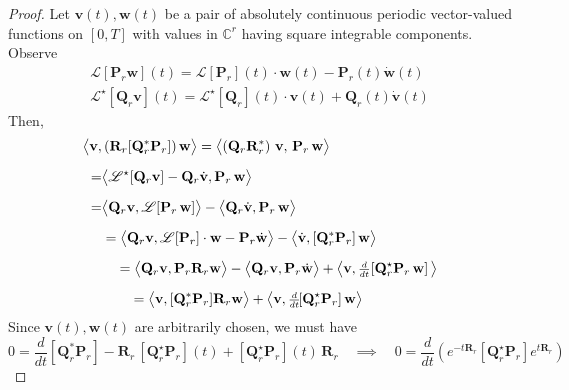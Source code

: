 \documentclass[pdflatex,sn-mathphys-num]{sn-jnl}%
\theoremstyle{thmstyleone}%
\theoremstyle{thmstyletwo}%
\theoremstyle{thmstylethree}%
\begin{document}
\begin{proof}
  Let $\mathbf{v}(t), \mathbf{w}(t)$ be a pair of absolutely continuous periodic vector-valued functions on $[0,T]$ with values in $\mathbb{C}^r$ having square integrable components.  Observe
$$
\begin{array}{c}
\mathscr{L}[\mathbf{P}_r\mathbf{w}](t)=\mathscr{L}[\mathbf{P}_r](t)\cdot \mathbf{w}(t) - \mathbf{P}_r(t)\dot{\mathbf{w}}(t) \\[3mm]
\mathscr{L}^{\star}[\mathbf{Q}_r\mathbf{v}](t)=\mathscr{L}^{\star}[\mathbf{Q}_r](t)\cdot \mathbf{v}(t) + \mathbf{Q}_r(t)\dot{\mathbf{v}}(t)
\end{array}
$$
Then,
\begin{align*}
    \big\langle \mathbf{v},&\,(\mathbf{R}_{r}[\mathbf{Q}_r^{*}\mathbf{P}_r])\, \mathbf{w}\big\rangle  = 
    \big\langle (\mathbf{Q}_r\mathbf{R}_{r}^{*})\ \mathbf{v},\, \mathbf{P}_r\,\mathbf{w}\big\rangle \\[2mm]
    =&\big\langle  \mathscr{L}^{\star}[\mathbf{Q}_r\mathbf{v}]- \mathbf{Q}_r\dot{\mathbf{v}} ,\mathbf{P}_r\,\mathbf{w}\big\rangle \\[2mm]
   = & \big\langle  \mathbf{Q}_r\mathbf{v},\mathscr{L}[\mathbf{P}_r\,\mathbf{w}]\big\rangle - \big\langle \mathbf{Q}_r\dot{\mathbf{v}} ,\mathbf{P}_r\,\mathbf{w}\big\rangle \\[2mm]
   & = \big\langle  \mathbf{Q}_r\mathbf{v},\mathscr{L}[\mathbf{P}_r] \cdot \mathbf{w} - \mathbf{P}_r\dot{\mathbf{w}}\big\rangle - \big\langle \dot{\mathbf{v}} ,[\mathbf{Q}_r^{*}\mathbf{P}_r]\,\mathbf{w}\big\rangle \\[2mm] 
     &\quad = \big\langle  \mathbf{Q}_r\mathbf{v},\mathbf{P}_r\mathbf{R}_{r} \mathbf{w}\big\rangle -  \big\langle  \mathbf{Q}_r\mathbf{v},\mathbf{P}_r\dot{\mathbf{w}}\big\rangle + 
     \big\langle \mathbf{v} ,\mbox{\small $\frac{d}{dt}$}\!\left[\mathbf{Q}_r^{\star}\mathbf{P}_r\,\mathbf{w}\right]\big\rangle \\[2mm]
   &\qquad = \big\langle  \mathbf{v},[\mathbf{Q}_r^{*}\mathbf{P}_r]\mathbf{R}_{r} \mathbf{w}\big\rangle   + \big\langle \mathbf{v} ,\mbox{\small $\frac{d}{dt}$}\![\mathbf{Q}_r^{\star}\mathbf{P}_r]\,\mathbf{w}\big\rangle 
\end{align*}
Since $\mathbf{v}(t), \mathbf{w}(t)$ are arbitrarily chosen, we must have 
\begin{equation*}
0=\frac{d}{dt}\![\mathbf{Q}_r^{*}\mathbf{P}_r]-\mathbf{R}_{r}\,[\mathbf{Q}_r^{\star}\mathbf{P}_r](t)+[\mathbf{Q}_r^{\star}\mathbf{P}_r](t)\,\mathbf{R}_{r}
\quad \implies \quad 
0=\frac{d}{dt}\left(e^{-t\mathbf{R}_{r}}[\mathbf{Q}_r^{\star}\mathbf{P}_r]e^{t\mathbf{R}_{r}}\right)

\end{equation*}
\end{proof}
\end{document}
